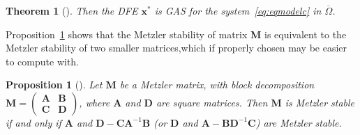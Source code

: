 \documentclass[a4paper]{article}
\newtheorem{prop}{Proposition}[section]
\newtheorem{thm}{Theorem}[section]
\begin{document}
{\begin{thm}[\cite{KamSal07}]
\noindent Then the DFE $\mathbf x^*$ is GAS for the system~\eqref{eq:eqmodelc} in $\overline{\Omega}$.
\end{thm}  

 Proposition~\ref{prop:blockdecomposition} shows that  the Metzler stability of matrix $\mathbf M$ is equivalent to the Metzler stability of two smaller matrices,which if properly chosen may be easier to compute with.

\begin{prop}[\cite{KamSal07}]
    Let  $\mathbf M$  be a Metzler matrix,  with block decomposition
    $\mathbf M=\left(\begin{array}{cc}
    \mathbf {A} & \mathbf {B}\\
    \mathbf {C} & \mathbf {D}
    \end{array}\right)$,
     where $ \mathbf {A}$ and $ \mathbf {D}$ are square matrices.
    \noindent Then      $\mathbf  M$ is Metzler stable if and only if 
    $\mathbf A$ and  $ \mathbf  D - \mathbf  C \mathbf A^{-1} \mathbf  B $ (or $\mathbf D$ and $\mathbf A-\mathbf B \mathbf D^{-1} \mathbf C$) are Metzler stable.
    \label{prop:blockdecomposition}
\end{prop}


  





}
\end{document}
